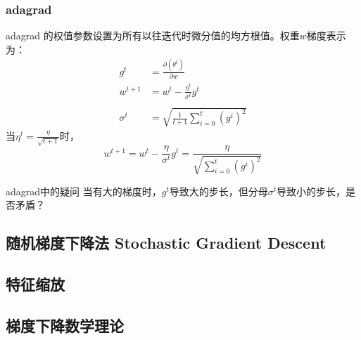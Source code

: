 \subsubsection{adagrad}
adagrad 的权值参数设置为所有以往迭代时微分值的均方根值。权重$w$梯度表示为：
\begin{align}
g^t &= \frac{\partial (\theta^t)}{\partial w}\\
w^{t+1} &= w^t - \frac{\eta^t}{\sigma^t}g^t\\
  \\
\sigma^t &= \sqrt{\frac{1}{t+1}\sum_{i=0}^{t}(g^i)^2}
\end{align}
当$\eta^t = \frac{\eta}{\sqrt{t+1}}$时，
\begin{equation}
w^{t+1} = w^t - \frac{\eta}{\sigma^t}g^t = \frac{\eta}{\sqrt{\sum_{i=0}^{t}(g^i)^2}}
\end{equation}
\begin{myquotation}{adagrad中的疑问}
	当有大的梯度时，$g^t$导致大的步长，但分母$\sigma ^ t$导致小的步长，是否矛盾？
\end{myquotation}

\subsection{随机梯度下降法 Stochastic Gradient Descent}

\subsection{特征缩放}

\subsection{梯度下降数学理论}



